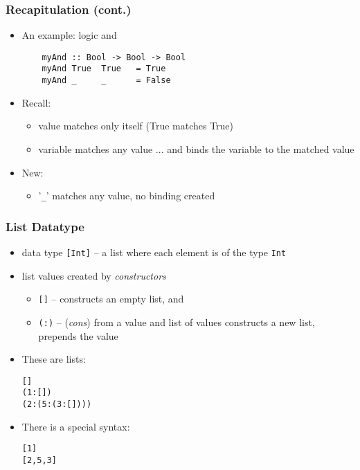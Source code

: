 \documentclass[final,handout]{beamer}
\begin{document}
\begin{frame}[fragile]
    \frametitle{Recapitulation (cont.)}

    \begin{itemize}
        \item An example: logic and
            \begin{verbatim}
    myAnd :: Bool -> Bool -> Bool
    myAnd True  True   = True
    myAnd _     _      = False
            \end{verbatim}

        \item Recall:
            \begin{itemize}
                \item value matches only itself (True matches True)
                \item variable matches any value ... and binds the variable to
                    the matched value
            \end{itemize}
        \item New:
            \begin{itemize}
                \item {\color{green} '\texttt{\_}' matches any value, no binding
                    created}
            \end{itemize}
  \end{itemize}

\end{frame}  



\begin{frame}[fragile]
    \frametitle{List Datatype}

    \begin{itemize}
        \item<1-> data type \texttt{[Int]} -- a list where each element is of
            the type \texttt{Int}

        \item<2-> list values created by \emph{constructors}
            \begin{itemize}
                \item \texttt{[]} -- constructs an empty list, and
                \item \texttt{(:)} -- (\emph{cons}) from a value and list of values constructs
                    a new list, prepends the value
            \end{itemize}

        \item<3-> These are lists:
            \begin{alltt}
        []
        (1 : [])
        (2 : (5 : (3 : [])))
            \end{alltt}
        \item<4-> There is a special syntax:
            \begin{alltt}
        [1]
        [2, 5, 3]
            \end{alltt}

    \end{itemize}
\end{frame}
\end{document}
